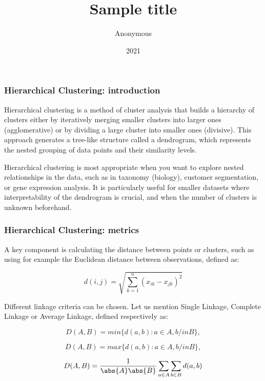 \documentclass[border=5mm, convert, usenames, dvipsnames,beamer]{standalone}
\title{Sample title}
\author{Anonymous}
\institute{Overleaf}
\date{2021}
\begin{document}
\begin{frame}[ fragile]{}
\frametitle{Hierarchical Clustering: introduction}

\normalsize
\vspace{40}
Hierarchical clustering is a method of cluster analysis that builds a hierarchy of clusters either by iteratively merging smaller clusters into larger ones (agglomerative) or by dividing a large cluster into smaller ones (divisive). This approach generates a tree-like structure called a dendrogram, which represents the nested grouping of data points and their similarity levels.

\normalsize
\vspace{10}
Hierarchical clustering is most appropriate when you want to explore nested relationships in the data, such as in taxonomy (biology), customer segmentation, or gene expression analysis. It is particularly useful for smaller datasets where interpretability of the dendrogram is crucial, and when the number of clusters is unknown beforehand.
\end{frame}



\begin{frame}[ fragile]{}
\frametitle{Hierarchical Clustering: metrics}

\normalsize
\vspace{40}
A key component is calculating the distance between points or clusters, such as using for example the Euclidean distance between observations, defined as:

$$
d(i,j) = \sqrt{\sum_{k=1}^{n}(x_{ik} - x_{jk})^{2}}
$$

\normalsize
\vspace{5}
Different linkage criteria can be chosen. Let us mention Single Linkage, Complete Linkage or Average Linkage, defined respectively as:

$$
D(A,B) = min\{d(a,b) : a \in A, b /in B \},
$$

$$
D(A, B) = max\{d(a,b) : a \in A, b /in B \},
$$

$$
D(A, B) = \frac{1}{\abs{A} \abs{B}} \sum_{a \in  A}\sum_{b \in B} d(a,b)
$$


\end{frame}
\end{document}
